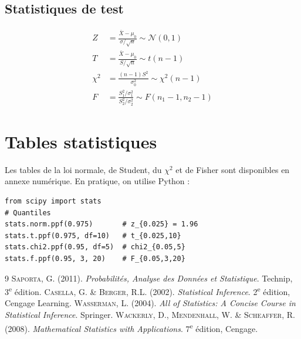 \documentclass[12pt,a4paper,twoside]{book}
\theoremstyle{definition}
\theoremstyle{plain}
\theoremstyle{remark}
\begin{document}
\section{Statistiques de test}

\begin{align}
Z &= \frac{\bar{X}-\mu_0}{\sigma/\sqrt{n}} \sim \mathcal{N}(0,1) \\
T &= \frac{\bar{X}-\mu_0}{S/\sqrt{n}} \sim t(n-1) \\
\chi^2 &= \frac{(n-1)S^2}{\sigma_0^2} \sim \chi^2(n-1) \\
F &= \frac{S_1^2/\sigma_1^2}{S_2^2/\sigma_2^2} \sim F(n_1-1,n_2-1)
\end{align}

\chapter{Tables statistiques}
\label{app:tables}

Les tables de la loi normale, de Student, du $\chi^2$ et de Fisher sont disponibles en annexe num\'erique. En pratique, on utilise Python :

\begin{verbatim}
from scipy import stats
# Quantiles
stats.norm.ppf(0.975)       # z_{0.025} = 1.96
stats.t.ppf(0.975, df=10)   # t_{0.025,10}
stats.chi2.ppf(0.95, df=5)  # chi2_{0.05,5}
stats.f.ppf(0.95, 3, 20)    # F_{0.05,3,20}
\end{verbatim}


\begin{thebibliography}{9}
 \textsc{Saporta}, G. (2011). \emph{Probabilit\'es, Analyse des Donn\'ees et Statistique}. Technip, 3\textsuperscript{e} \'edition.
 \textsc{Casella}, G. \& \textsc{Berger}, R.L. (2002). \emph{Statistical Inference}. 2\textsuperscript{e} \'edition, Cengage Learning.
 \textsc{Wasserman}, L. (2004). \emph{All of Statistics: A Concise Course in Statistical Inference}. Springer.
 \textsc{Wackerly}, D., \textsc{Mendenhall}, W. \& \textsc{Scheaffer}, R. (2008). \emph{Mathematical Statistics with Applications}. 7\textsuperscript{e} \'edition, Cengage.
\end{thebibliography}

\printindex
\end{document}
